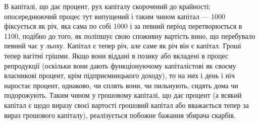 В капіталі, що дає процент, рух капіталу скорочений до
крайності; опосереднюючий процес тут випущений і таким чином
капітал — 1000 фіксується як річ, яка сама по собі \deq{} 1000 і за певний
період перетворюється в 1100, подібно до того, як поліпшує
свою споживну вартість вино, що перебувало певний час у льоху.
Капітал є тепер річ, але саме як річ він є капітал. Гроші тепер
вагітні грішми. Якщо вони віддані в позику або вкладені в процес
репродукції (оскільки вони дають функціонуючому капіталістові
як своєму власникові процент, крім підприємницького доходу), то
на них і день і ніч наростає процент, однаково, чи сплять вони,
чи пильнують, сидять дома чи подорожують. Таким чином у
грошовому капіталі, що дає процент (а всякий капітал є щодо виразу
своєї вартості грошовий капітал або вважається тепер
за вираз грошового капіталу), реалізується побожне бажання збирача
скарбів.
